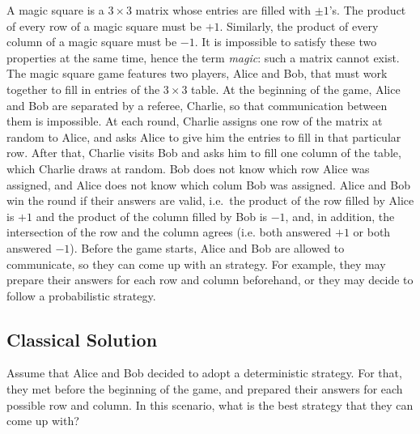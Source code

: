 \documentclass{llncs}
\begin{document}
A magic square is a \(3 \times 3\) matrix whose entries are filled
with \(\pm 1\)'s. The product of every row of a magic square must be
\(+1\). Similarly, the product of every column of a magic square must
be \(-1\). It is impossible to satisfy these two properties at the same
time, hence the term \emph{magic}: such a matrix cannot exist. The
magic square game features two players, Alice and Bob, that must work
together to fill in entries of the \(3 \times 3\) table.  At the
beginning of the game, Alice and Bob are separated by a referee,
Charlie, so that communication between them is impossible. At each
round, Charlie assigns one row of the matrix at random to Alice, and
asks Alice to give him the entries to fill in that particular
row. After that, Charlie visits Bob and asks him to fill one column of
the table, which Charlie draws at random.  Bob does not know which row
Alice was assigned, and Alice does not know which colum Bob was
assigned. Alice and Bob win the round if their answers are valid,
i.e.\ the product of the row filled by Alice is \(+1\) and the product
of the column filled by Bob is \(-1\), and, in addition, the
intersection of the row and the column agrees (i.e. both answered
\(+1\) or both answered \(-1\)). Before the game starts, Alice and Bob
are allowed to communicate, so they can come up with an strategy.  For
example, they may prepare their answers for each row and column
beforehand, or they may decide to follow a probabilistic strategy.

\subsection{Classical Solution}
\label{sec:classic-sol}
Assume that Alice and Bob decided to adopt a deterministic strategy.
For that, they met before the beginning of the game, and prepared
their answers for each possible row and column. In this scenario,
what is the best strategy that they can come up with?
\end{document}
